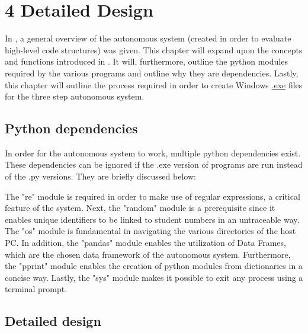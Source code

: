 

\chapter*{4 Detailed Design}
\label{4detailedd}
\setcounter{chapter}{4}
\setcounter{section}{0}
\setcounter{figure}{0}
\setcounter{table}{0}

In \textbf{}, a general overview of the autonomous system (created in order to evaluate high-level code structures) was given. This chapter will expand upon the concepts and functions introduced in \textbf{}. It will, furthermore, outline the python modules required by the various programs and outline why they are dependencies. Lastly, this chapter will outline the process required in order to create Windows \hyperref[listExt]{.exe} files for the three step autonomous system. 

\section{Python dependencies}
\label{PyDep}
In order for the autonomous system to work, multiple python dependencies exist. These dependencies can be ignored if the .exe version of programs are run instead of the .py versions. They are briefly discussed below:



The "re" module is required in order to make use of regular expressions, a critical feature of the system. Next, the "random" module is a prerequisite since it enables unique identifiers to be linked to student numbers in an untraceable way. The "os" module is fundamental in navigating the various directories of the host PC. In addition, the "pandas" module enables the utilization of Data Frames, which are the chosen data framework of the autonomous system. Furthermore, the "pprint" module enables the creation of python modules from dictionaries in a concise way. Lastly, the "sys" module makes it possible to exit any process using a terminal prompt.


\section{Detailed design}
\label{detDes}

